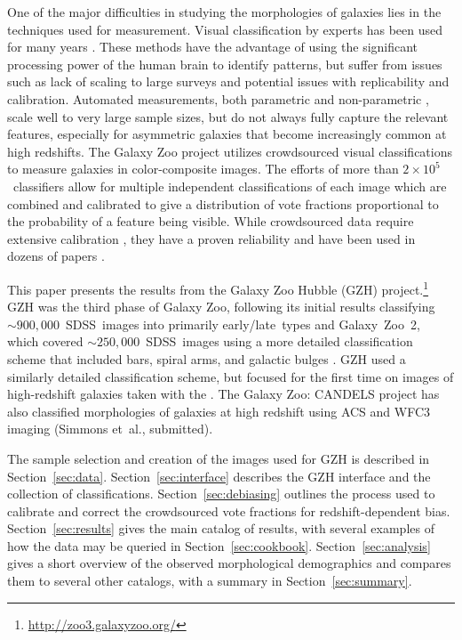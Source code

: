 \documentclass[twocolumn]{aastex6}
\begin{document}
One of the major difficulties in studying the morphologies of galaxies lies in the techniques used for measurement. Visual classification by experts has been used for many years \citep[eg,][]{hub26,dev59,san61,van76,nai10,bai11,kar15}. These methods have the advantage of using the significant processing power of the human brain to identify patterns, but suffer from issues such as lack of scaling to large surveys and potential issues with replicability and calibration. Automated measurements, both parametric \citep{pen02a,sim11,lac12} and non-parametric \citep{abr03,con03,lot04,sca07,bam08,fre13}, scale well to very large sample sizes, but do not always fully capture the relevant features, especially for asymmetric galaxies that become increasingly common at high redshifts. The Galaxy Zoo project \citep{lin08,lin11} utilizes crowdsourced visual classifications to measure galaxies in color-composite images. The efforts of more than $2\times10^5$~classifiers allow for multiple independent classifications of each image which are combined and calibrated to give a distribution of vote fractions proportional to the probability of a feature being visible. While crowdsourced data require extensive calibration \citep{bam09,wil13}, they have a proven reliability and have been used in dozens of papers \citep[eg,][]{lan08,bam09,dar10,mas11c,ski12,sim13,sch14,wil15}. 

This paper presents the results from the Galaxy Zoo Hubble (GZH) project.\footnote{\url{http://zoo3.galaxyzoo.org/}} GZH was the third phase of Galaxy Zoo, following its initial results classifying $\sim900,000$~SDSS~images into primarily early/late~types \citep{lin11} and Galaxy~Zoo~2, which covered $\sim250,000$~SDSS~images using a more detailed classification scheme that included bars, spiral arms, and galactic bulges \citep{wil13}. GZH used a similarly detailed classification scheme, but focused for the first time on images of high-redshift galaxies taken with the \hubble. The Galaxy Zoo: CANDELS project has also classified morphologies of galaxies at high redshift using ACS and WFC3 imaging (Simmons et~al., submitted).

The sample selection and creation of the images used for GZH is described in Section~\ref{sec:data}. Section~\ref{sec:interface} describes the GZH interface and the collection of classifications. Section~\ref{sec:debiasing} outlines the process used to calibrate and correct the crowdsourced vote fractions for redshift-dependent bias. Section~\ref{sec:results} gives the main catalog of results, with several examples of how the data may be queried in Section~\ref{sec:cookbook}. Section~\ref{sec:analysis} gives a short overview of the observed morphological demographics and compares them to several other catalogs, with a summary in Section~\ref{sec:summary}.
\end{document}
